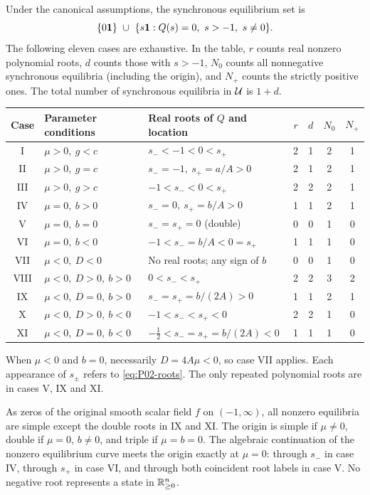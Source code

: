 \begin{theorem}
\label{thm:P02-complete}
Under the canonical assumptions, the synchronous equilibrium set is
\begin{equation}
\label{eq:P02-equilibrium-set}
 \{0\mathbf{1}\}\ \cup\
 \{s\mathbf{1}:Q(s)=0,\ s>-1,\ s\ne0\}.
\end{equation}
The following eleven cases are exhaustive. In the table, $r$ counts
real nonzero polynomial roots, $d$ counts those with $s>-1$, $N_0$
counts all nonnegative synchronous equilibria (including the origin),
and $N_+$ counts the strictly positive ones. The total number of
synchronous equilibria in $\mathcal{U}$ is $1+d$.

\begin{center}
\small
\renewcommand{\arraystretch}{1.18}
\begin{tabular}{@{}c p{} p{} c c c c@{}}
\toprule
Case & Parameter conditions & Real roots of $Q$ and location
 & $r$ & $d$ & $N_0$ & $N_+$\\
\midrule
I & $\mu>0,\ g<c$ & $s_-<-1<0<s_+$ & 2&1&2&1\\
II & $\mu>0,\ g=c$ & $s_-=-1,\ s_+=a/A>0$ & 2&1&2&1\\
III & $\mu>0,\ g>c$ & $-1<s_-<0<s_+$ & 2&2&2&1\\
IV & $\mu=0,\ b>0$ & $s_-=0,\ s_+=b/A>0$ & 1&1&2&1\\
V & $\mu=0,\ b=0$ & $s_-=s_+=0$ (double) & 0&0&1&0\\
VI & $\mu=0,\ b<0$ & $-1<s_-=b/A<0=s_+$ & 1&1&1&0\\
VII & $\mu<0,\ D<0$ & No real roots; any sign of $b$ & 0&0&1&0\\
VIII & $\mu<0,\ D>0,\ b>0$ & $0<s_-<s_+$ & 2&2&3&2\\
IX & $\mu<0,\ D=0,\ b>0$ & $s_-=s_+=b/(2A)>0$ & 1&1&2&1\\
X & $\mu<0,\ D>0,\ b<0$ & $-1<s_-<s_+<0$ & 2&2&1&0\\
XI & $\mu<0,\ D=0,\ b<0$ & $-\tfrac12<s_-=s_+=b/(2A)<0$ & 1&1&1&0\\
\bottomrule
\end{tabular}
\end{center}
When $\mu<0$ and $b=0$, necessarily $D=4A\mu<0$, so case VII
applies. Each appearance of $s_\pm$ refers to \eqref{eq:P02-roots}.
The only repeated polynomial roots are in cases V, IX and XI.

As zeros of the original smooth scalar field $f$ on $(-1,\infty)$,
all nonzero equilibria are simple except the double roots in IX and XI.
The origin is simple if $\mu\ne0$, double if $\mu=0$, $b\ne0$,
and triple if $\mu=b=0$. The algebraic continuation of the nonzero
equilibrium curve meets the origin exactly at $\mu=0$: through $s_-$
in case IV, through $s_+$ in case VI, and through both coincident
root labels in case V. No negative root represents a state in $\mathbb{R}_{\geq 0}^{n}$.
\end{theorem}

